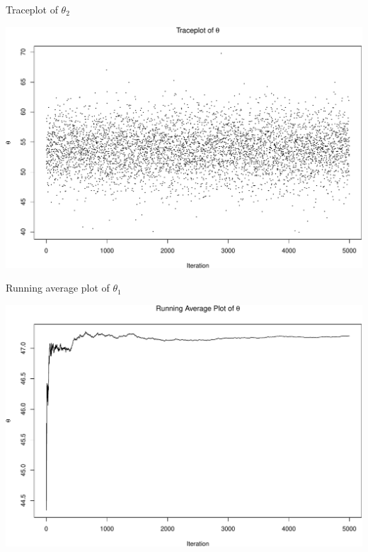 \documentclass[
  ignorenonframetext,
]{beamer}
\begin{document}
\begin{frame}{Traceplot of \(\theta_2\)}
\protect\hypertarget{traceplot-of-theta_2}{}

\includegraphics{08-multivariate-norm_files/figure-beamer/unnamed-chunk-13-1.pdf}

\end{frame}

\begin{frame}{Running average plot of \(\theta_1\)}
\protect\hypertarget{running-average-plot-of-theta_1}{}

\includegraphics{08-multivariate-norm_files/figure-beamer/unnamed-chunk-14-1.pdf}

\end{frame}
\end{document}
